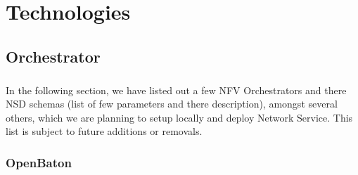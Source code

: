 \chapter{Technologies}
\label{ch:Technologies}

\section{Orchestrator}

\paragraph{}
In the following section, we have listed out a few NFV Orchestrators and there NSD schemas (list of few parameters and there description), amongst several others, which we are planning to setup locally and deploy Network Service. This list is subject to future additions or removals.

\subsection{OpenBaton}
